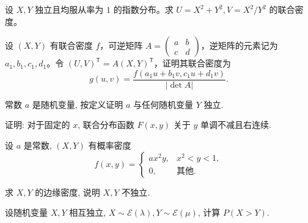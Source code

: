 \begin{exercise}[平方和与平方比的变换]\label{q:Y4.34}
设 $X,Y$ 独立且均服从率为 $1$ 的指数分布。求 $U=X^2+Y^2,V=X^2/Y^2$ 的联合密度。\par{}\end{exercise}

\begin{exercise}[线性变换的密度公式]\label{q:Y4.36}
设 $(X,Y)$ 有联合密度 $f$，可逆矩阵 $A=\begin{pmatrix}a&b\\c&d\end{pmatrix}$，逆矩阵的元素记为 $a_1,b_1,c_1,d_1$。令 $(U,V)^\mathsf T=A(X,Y)^\mathsf T$，证明其联合密度为\[g(u,v)=\frac{f(a_1u+b_1v,c_1u+d_1v)}{|\det A|}.\]\par{}\end{exercise}

\begin{exercise}[常数与任意变量独立]\label{q:A4.4}
常数 $a$ 是随机变量, 按定义证明 $a$ 与任何随机变量 $Y$ 独立.\par{}\end{exercise}

\begin{exercise}[联合分布函数的右连续性]\label{q:A4.5}
证明: 对于固定的 $x$, 联合分布函数 $F(x,y)$ 关于 $y$ 单调不减且右连续.\par{}\end{exercise}

\begin{exercise}[曲边区域上的联合密度]\label{q:A4.11}
设 $a$ 是常数, $(X,Y)$ 有概率密度
    \[f(x,y)=\begin{cases}
        ax^2y, & x^2<y<1, \\
        0, & \text{其他}.
    \end{cases}\]

    求 $X,Y$ 的边缘密度, 说明 $X,Y$ 不独立.\par{}\end{exercise}

\begin{exercise}[指数寿命的比较]\label{q:A4.14}
设随机变量 $X,Y$ 相互独立, $X\sim\mathcal{E}(\lambda),Y\sim\mathcal{E}(\mu)$, 计算 $P(X>Y)$.\par{}\end{exercise}

